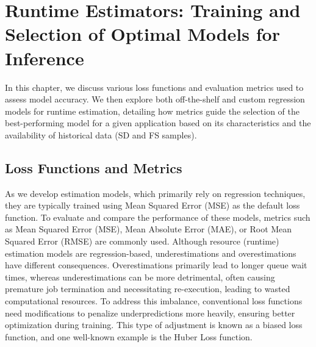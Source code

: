 \chapter{Runtime Estimators: Training and Selection of Optimal Models for Inference}
\label{BuildEstimator.ch}

In this chapter, we discuss various loss functions and evaluation metrics used to assess model accuracy. We then explore both off-the-shelf and custom regression models for runtime estimation, detailing how metrics guide the selection of the best-performing model for a given application based on its characteristics and the availability of historical data (SD and FS samples).

\section{Loss Functions and Metrics}
As we develop estimation models, which primarily rely on regression techniques, they are typically trained using Mean Squared Error (MSE) as the default loss function. To evaluate and compare the performance of these models, metrics such as Mean Squared Error (MSE), Mean Absolute Error (MAE), or Root Mean Squared Error (RMSE) are commonly used.
Although resource (runtime) estimation models are regression-based, underestimations and overestimations have different consequences. Overestimations primarily lead to longer queue wait times, whereas underestimations can be more detrimental, often causing premature job termination and necessitating re-execution, leading to wasted computational resources. To address this imbalance, conventional loss functions need modifications to penalize underpredictions more heavily, ensuring better optimization during training. This type of adjustment is known as a biased loss function, and one well-known example is the Huber Loss function.

